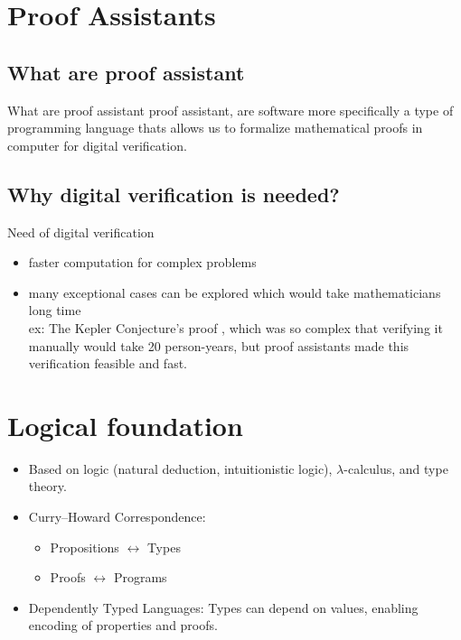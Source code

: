 \documentclass[aspectratio=169, 12pt]{beamer}
\begin{document}
\TitlePage        
\SectionPage    
\SubsectionPage    %
\ProgressBar       %
\PageNumbering     %


     

\section{Proof Assistants} 
\subsection*{What are proof assistant}
\begin{frame}{What are proof assistant}
    proof assistant, are software more specifically a type of programming language thats allows us to 
    formalize mathematical proofs in computer for digital verification. 
\end{frame}
\subsection*{Why digital verification is needed?}
\begin{frame}{Need of digital verification}
    \begin{itemize}
        \item faster computation for complex problems
        \item many exceptional cases can be explored which would take mathematicians  long time \\
           \indent  \footnotesize ex:   The Kepler Conjecture's proof , which was so complex that verifying it manually would take 20 person-years, but proof assistants made this verification feasible and fast. 
    \end{itemize}
\end{frame}
\section{Logical foundation}
\begin{frame}
    \begin{itemize}
    \item Based on logic (natural deduction, intuitionistic logic), $\lambda$-calculus, and type theory.
    \item Curry–Howard Correspondence:
    \begin{itemize}
        \item Propositions $\leftrightarrow$ Types
        \item Proofs $\leftrightarrow$ Programs
    \end{itemize}
    \item Dependently Typed Languages: Types can depend on values, enabling encoding of properties and proofs.
\end{itemize}
\end{frame}
\end{document}
